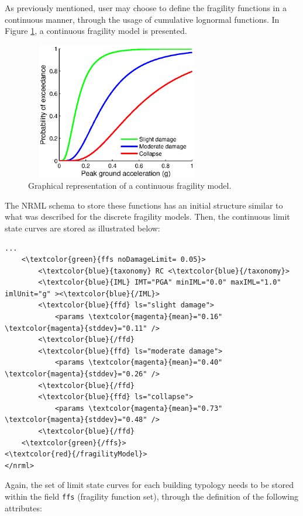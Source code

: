 As previously mentioned, user may choose to define the fragility functions in a continuous manner, through the usage of cumulative lognormal functions. In Figure \ref{fig:fragModelContinuous}, a continuous fragility model is presented.

\begin{figure}[ht]
\centering
\includegraphics[width=8cm,height=6cm]{./figures/risk/ConFragilityModel.eps}
\caption{Graphical representation of a continuous fragility model.}
\label{fig:fragModelContinuous}
\end{figure}

The NRML schema to store these functions has an initial structure similar to what was described for the discrete fragility models. Then, the continuous limit state curves are stored as illustrated below:

\begin{Verbatim}[frame=single, commandchars=\\\{\}, samepage=true]
    ...  
    <\textcolor{green}{ffs noDamageLimit= 0.05}> 
        <\textcolor{blue}{taxonomy} RC <\textcolor{blue}{/taxonomy}>
        <\textcolor{blue}{IML} IMT="PGA" minIML="0.0" maxIML="1.0" imlUnit="g" ><\textcolor{blue}{/IML}>
        <\textcolor{blue}{ffd} ls="slight damage">
            <params \textcolor{magenta}{mean}="0.16" \textcolor{magenta}{stddev}="0.11" />
        <\textcolor{blue}{/ffd}
        <\textcolor{blue}{ffd} ls="moderate damage">
            <params \textcolor{magenta}{mean}="0.40" \textcolor{magenta}{stddev}="0.26" />
        <\textcolor{blue}{/ffd}
        <\textcolor{blue}{ffd} ls="collapse">
            <params \textcolor{magenta}{mean}="0.73" \textcolor{magenta}{stddev}="0.48" />
        <\textcolor{blue}{/ffd}      
    <\textcolor{green}{/ffs}> 
<\textcolor{red}{/fragilityModel}>
</nrml>        
\end{Verbatim}

Again, the set of limit state curves for each building typology needs to be stored within the field \Verb+ffs+ (fragility function set), through the definition of the following attributes:

